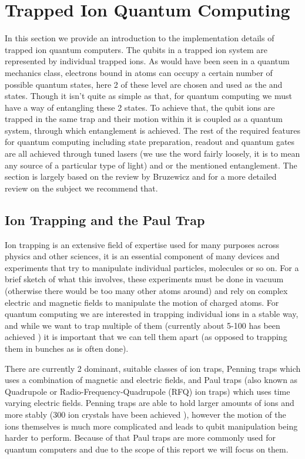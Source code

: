 
\section{Trapped Ion Quantum Computing} \label{sec:Trapped}
In this section we provide an introduction to the implementation details of trapped ion quantum computers.
The qubits in a trapped ion system are represented by individual trapped ions.
As would have been seen in a quantum mechanics class, electrons bound in atoms can occupy a certain number of possible quantum states, here 2 of these level are chosen and used as the \kz and \ko states.
Though it isn't quite as simple as that, for quantum computing we must have a way of entangling these 2 states.
To achieve that, the qubit ions are trapped in the same trap and their motion within it is coupled as a quantum system, through which entanglement is achieved.
The rest of the required features for quantum computing including state preparation, readout and quantum gates are all achieved through tuned lasers (we use the word fairly loosely, it is to mean any source of a particular type of light) and or the mentioned entanglement.
The section is largely based on the review by Bruzewicz \cite{bruzewiczTrappedionQuantumComputing2019} and for a more detailed review on the subject we recommend that.

\subsection{Ion Trapping and the Paul Trap}
Ion trapping is an extensive field of expertise used for many purposes across physics and other sciences, it is an essential component of many devices and experiments that try to manipulate individual particles, molecules or so on.
For a brief sketch of what this involves, these experiments must be done in vacuum (otherwise there would be too many other atoms around) and rely on complex electric and magnetic fields to manipulate the motion of charged atoms.
For quantum computing we are interested in trapping individual ions in a stable way, and while we want to trap multiple of them (currently about 5-100 has been achieved \cite{paganoCryogenicTrappedionSystem2018}) it is important that we can tell them apart (as opposed to trapping them in bunches as is often done).

There are currently 2 dominant, suitable classes of ion traps, Penning traps which uses a combination of magnetic and electric fields, and Paul traps (also known as Quadrupole or Radio-Frequency-Quadrupole (RFQ) ion traps) which uses time varying electric fields.
Penning traps are able to hold larger amounts of ions and more stably (300 ion crystals have been achieved \cite{bohnetQuantumSpinDynamics2016}), however the motion of the ions themselves is much more complicated and leads to qubit manipulation being harder to perform.
Because of that Paul traps are more commonly used for quantum computers and due to the scope of this report we will focus on them.

